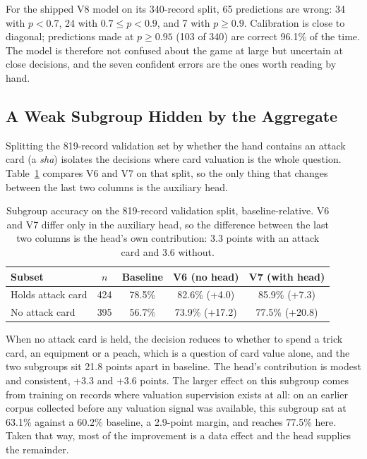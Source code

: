 \documentclass[11pt]{article}
\begin{document}
For the shipped V8 model on its 340-record split, 65 predictions are wrong: 34 with
$p<0.7$, 24 with $0.7\le p<0.9$, and 7 with $p\ge 0.9$. Calibration is close to diagonal;
predictions made at $p\ge 0.95$ (103 of 340) are correct 96.1\% of the time. The model is
therefore not confused about the game at large but uncertain at close decisions, and the
seven confident errors are the ones worth reading by hand.

\subsection{A Weak Subgroup Hidden by the Aggregate}
\label{sec:subgroup}

Splitting the 819-record validation set by whether the hand contains an attack card (a
\emph{sha}) isolates the decisions where card valuation is the whole question.
Table~\ref{tab:subgroup} compares V6 and V7 on that split, so the only thing that changes
between the last two columns is the auxiliary head.

\begin{table}[t]
\centering
\small
\begin{tabular}{@{}lcccc@{}}
\toprule
\textbf{Subset} & \textbf{$n$} & \textbf{Baseline} & \textbf{V6 (no head)} & \textbf{V7 (with head)} \\
\midrule
Holds attack card & 424 & 78.5\% & 82.6\% (+4.0) & 85.9\% (+7.3) \\
No attack card & 395 & 56.7\% & 73.9\% (+17.2) & 77.5\% (+20.8) \\
\bottomrule
\end{tabular}
\caption{Subgroup accuracy on the 819-record validation split, baseline-relative. V6 and V7
differ only in the auxiliary head, so the difference between the last two columns is the
head's own contribution: 3.3 points with an attack card and 3.6 without.}
\label{tab:subgroup}
\end{table}

When no attack card is held, the decision reduces to whether to spend a trick card, an
equipment or a peach, which is a question of card value alone, and the two subgroups sit
21.8 points apart in baseline. The head's contribution is modest and consistent, +3.3 and
+3.6 points. The larger effect on this subgroup comes from training on records where
valuation supervision exists at all: on an earlier corpus collected before any valuation
signal was available, this subgroup sat at 63.1\% against a 60.2\% baseline, a 2.9-point
margin, and reaches 77.5\% here. Taken that way, most of the improvement is a data effect
and the head supplies the remainder.
\end{document}
